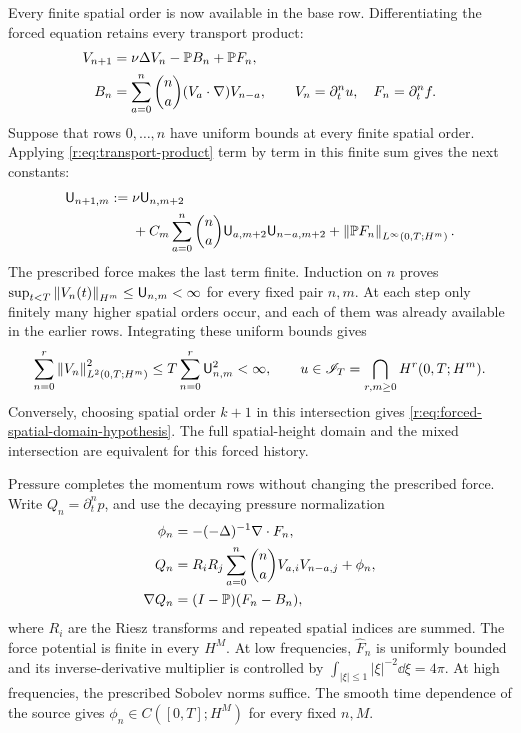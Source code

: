 Every finite spatial order is now available in the base row.
Differentiating the forced equation retains every transport product:
\begin{equation}
 \begin{aligned}
 V_{n+1}&=\nu\Delta V_n-\mathbb P B_n+\mathbb P F_n,\\
 B_n&=\sum_{a=0}^n\binom na(V_a\cdot\nabla)V_{n-a},
 \qquad V_n=\partial_t^nu,\quad F_n=\partial_t^nf.
 \end{aligned}
 \label{r:eq:forced-domain-row-recurrence}
\end{equation}
Suppose that rows \(0,\ldots,n\) have uniform bounds at every finite
spatial order. Applying \eqref{r:eq:transport-product} term by term in
this finite sum gives the next constants:
\begin{equation}
 \begin{aligned}
 \mathsf U_{n+1,m}:={}&\nu\mathsf U_{n,m+2}\\
 &+C_m\sum_{a=0}^n\binom na
       \mathsf U_{a,m+2}\mathsf U_{n-a,m+2}
       +\left\lVert \mathbb P F_n\right\rVert_{L^\infty(0,T;H^m)}.
 \end{aligned}
 \label{r:eq:forced-domain-row-bounds}
\end{equation}
The prescribed force makes the last term finite. Induction on \(n\)
proves
\(\sup_{t<T}\left\lVert V_n(t)\right\rVert_{H^m}\le\mathsf U_{n,m}<\infty\)
for every fixed pair \(n,m\). At each step only finitely many higher
spatial orders occur, and each of them was already available in the
earlier rows. Integrating these uniform bounds gives
\begin{equation}
 \sum_{n=0}^r\left\lVert V_n\right\rVert_{L^2(0,T;H^m)}^2
 \le T\sum_{n=0}^r\mathsf U_{n,m}^2<\infty,
 \qquad
 u\in\mathscr I_T=\bigcap_{r,m\ge0}H^r(0,T;H^m).
 \label{r:eq:forced-domain-mixed-intersection}
\end{equation}
Conversely, choosing spatial order \(k+1\) in this intersection gives
\eqref{r:eq:forced-spatial-domain-hypothesis}. The full spatial-height
domain and the mixed intersection are equivalent for this forced
history.

Pressure completes the momentum rows without changing the prescribed
force. Write \(Q_n=\partial_t^np\), and use the decaying pressure
normalization
\begin{equation}
 \begin{aligned}
 \phi_n&=-(-\Delta)^{-1}\nabla\cdot F_n,\\
 Q_n&=R_iR_j\sum_{a=0}^n\binom na
                     V_{a,i}V_{n-a,j}+\phi_n,\\
 \nabla Q_n&=(I-\mathbb P)(F_n-B_n),
 \end{aligned}
 \label{r:eq:forced-domain-pressure}
\end{equation}
where \(R_i\) are the Riesz transforms and repeated spatial indices
are summed. The force potential is finite in every \(H^M\).
At low frequencies, \(\widehat F_n\) is uniformly bounded and its
inverse-derivative multiplier is controlled by
\(\int_{|\xi|\le1}|\xi|^{-2}\dd\xi=4\pi\).
At high frequencies, the prescribed Sobolev norms suffice. The smooth
time dependence of the source gives
\(\phi_n\in C([0,T];H^M)\) for every fixed \(n,M\).

